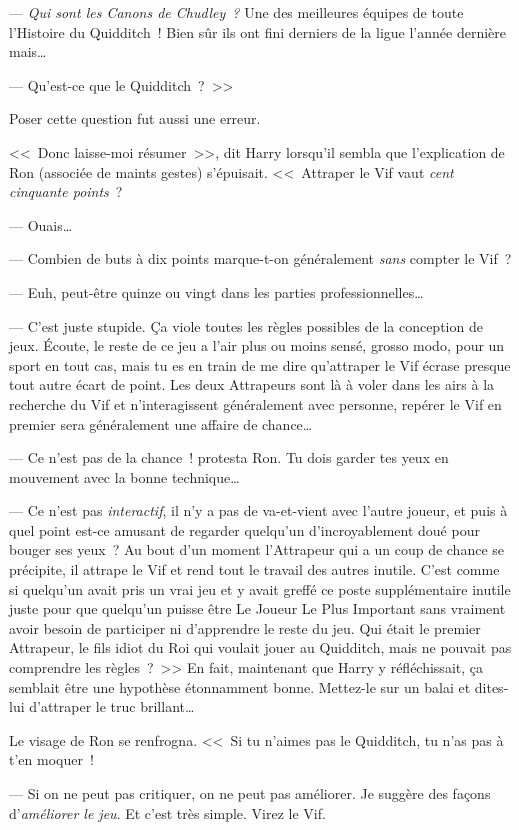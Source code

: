 --- \emph{Qui sont les Canons de Chudley~?} Une des meilleures équipes de toute l'Histoire du Quidditch~! Bien sûr ils ont fini derniers de la ligue l'année dernière mais…

--- Qu'est-ce que le Quidditch~?~>>

Poser cette question fut aussi une erreur.

<<~Donc laisse-moi résumer~>>, dit Harry lorsqu'il sembla que l'explication de Ron (associée de maints gestes) s'épuisait. <<~Attraper le Vif vaut \emph{cent cinquante points}~?

--- Ouais…

--- Combien de buts à dix points marque-t-on généralement \emph{sans} compter le Vif~?

--- Euh, peut-être quinze ou vingt dans les parties professionnelles…

--- C'est juste stupide. Ça viole toutes les règles possibles de la conception de jeux. Écoute, le reste de ce jeu a l'air plus ou moins sensé, grosso modo, pour un sport en tout cas, mais tu es en train de me dire qu'attraper le Vif écrase presque tout autre écart de point. Les deux Attrapeurs sont là à voler dans les airs à la recherche du Vif et n'interagissent généralement avec personne, repérer le Vif en premier sera généralement une affaire de chance…

--- Ce n'est pas de la chance~! protesta Ron. Tu dois garder tes yeux en mouvement avec la bonne technique…

--- Ce n'est pas \emph{interactif}, il n'y a pas de va-et-vient avec l'autre joueur, et puis à quel point est-ce amusant de regarder quelqu'un d'incroyablement doué pour bouger ses yeux~? Au bout d'un moment l'Attrapeur qui a un coup de chance se précipite, il attrape le Vif et rend tout le travail des autres inutile. C'est comme si quelqu'un avait pris un vrai jeu et y avait greffé ce poste supplémentaire inutile juste pour que quelqu'un puisse être Le Joueur Le Plus Important sans vraiment avoir besoin de participer ni d'apprendre le reste du jeu. Qui était le premier Attrapeur, le fils idiot du Roi qui voulait jouer au Quidditch, mais ne pouvait pas comprendre les règles~?~>> En fait, maintenant que Harry y réfléchissait, ça semblait être une hypothèse étonnamment bonne. Mettez-le sur un balai et dites-lui d'attraper le truc brillant…

Le visage de Ron se renfrogna.
<<~Si tu n'aimes pas le Quidditch, tu n'as pas à t'en moquer~!

--- Si on ne peut pas critiquer, on ne peut pas améliorer. Je suggère des façons d'\emph{améliorer le jeu}. Et c'est très simple. Virez le Vif.

